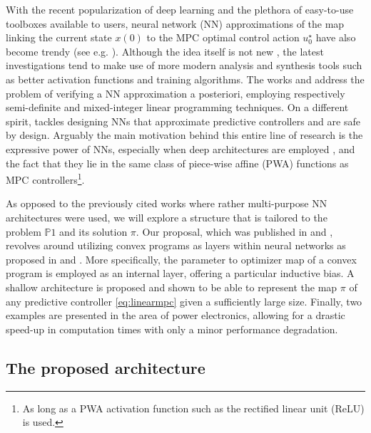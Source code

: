 With the recent popularization of deep learning and the plethora of easy-to-use toolboxes available to users, neural network (NN) approximations of the map linking the current state $x(0)$ to the MPC optimal control action $u_0^\star$ have also become trendy (see e.g. \cite{karg2020efficient,kumar2021industrial}). Although the idea itself is not new \citep{parisini1995receding}, the latest investigations tend to make use of more modern analysis and synthesis tools such as better activation functions and training algorithms. The works \cite{fazlyab2020safety} and \cite{schwan2022stability} address the problem of verifying a NN approximation a posteriori, employing respectively semi-definite and mixed-integer linear programming techniques. On a different spirit, \cite{paulson2020approximate} tackles designing NNs that approximate predictive controllers and are safe by design. Arguably the main motivation behind this entire line of research is the expressive power of NNs, especially when deep architectures are employed \cite{karg2020efficient}, and the fact that they lie in the same class of piece-wise affine (PWA) functions as MPC controllers\footnote{As long as a PWA activation function such as the rectified linear unit (ReLU) is used.}.

As opposed to the previously cited works where rather multi-purpose NN architectures were used, we will explore a structure that is tailored to the problem $\mathds{P}1$ and its solution $\pi$. Our proposal, which was published in \cite{maddalena2020neural} and \cite{maddalena2021embedded}, revolves around utilizing convex programs as layers within neural networks as proposed in \cite{amos2017optnet} and \cite{agrawal2019differentiable}. More specifically, the parameter to optimizer map of a convex program is employed as an internal layer, offering a particular inductive bias. A shallow architecture is proposed and shown to be able to represent the map $\pi$ of any predictive controller \eqref{eq:linearmpc} given a sufficiently large size. Finally, two examples are presented in the area of power electronics, allowing for a drastic speed-up in computation times with only a minor performance degradation.
	
\subsection{The proposed architecture}

